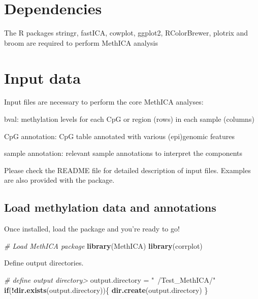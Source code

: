 \documentclass[]{article}
\newenvironment{Shaded}{\begin{snugshade}}{\end{snugshade}}
\newcommand{\CommentTok}[1]{\textcolor[rgb]{0.56,0.35,0.01}{\textit{#1}}}
\newcommand{\ControlFlowTok}[1]{\textcolor[rgb]{0.13,0.29,0.53}{\textbf{#1}}}
\newcommand{\KeywordTok}[1]{\textcolor[rgb]{0.13,0.29,0.53}{\textbf{#1}}}
\newcommand{\NormalTok}[1]{#1}
\newcommand{\OperatorTok}[1]{\textcolor[rgb]{0.81,0.36,0.00}{\textbf{#1}}}
\newcommand{\StringTok}[1]{\textcolor[rgb]{0.31,0.60,0.02}{#1}}
\begin{document}
\hypertarget{dependencies}{%
\section{Dependencies}\label{dependencies}}

The R packages stringr, fastICA, cowplot, ggplot2, RColorBrewer, plotrix
and broom are required to perform MethICA analysis

\hypertarget{input-data}{%
\section{Input data}\label{input-data}}

Input files are necessary to perform the core MethICA analyses:

bval: methylation levels for each CpG or region (rows) in each sample
(columns)

CpG annotation: CpG table annotated with various (epi)genomic features

sample annotation: relevant sample annotations to interpret the
components

Please check the README file for detailed description of input files.
Examples are also provided with the package.

\hypertarget{load-methylation-data-and-annotations}{%
\subsection{Load methylation data and
annotations}\label{load-methylation-data-and-annotations}}

Once installed, load the package and you're ready to go!

\begin{Shaded}
\begin{Highlighting}[]
\CommentTok{# Load MethICA package}
\KeywordTok{library}\NormalTok{(MethICA)}
\KeywordTok{library}\NormalTok{(corrplot)}
\end{Highlighting}
\end{Shaded}

Define output directories.

\begin{Shaded}
\begin{Highlighting}[]
\CommentTok{# define output directory> }
\NormalTok{output.directory =}\StringTok{ "~/Test_MethICA/"}
\ControlFlowTok{if}\NormalTok{(}\OperatorTok{!}\KeywordTok{dir.exists}\NormalTok{(output.directory))\{}
  \KeywordTok{dir.create}\NormalTok{(output.directory)}
\NormalTok{\}}
\end{Highlighting}
\end{Shaded}
\end{document}
